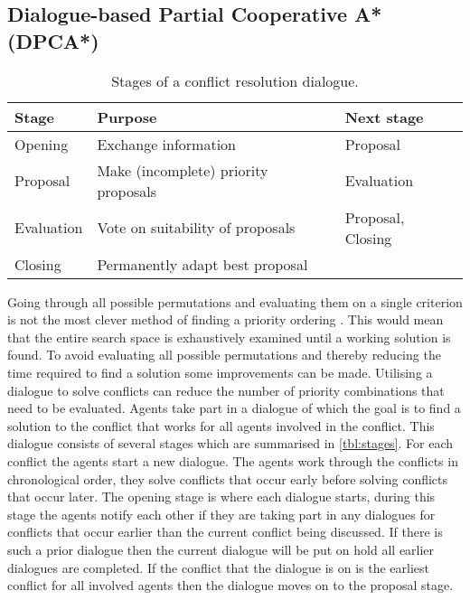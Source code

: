 \subsection{Dialogue-based Partial Cooperative A* (DPCA*)}
\begin{table}
    \centering
    \caption{Stages of a conflict resolution dialogue.}
    \label{tbl:stages}
    \begin{tabularx}{\columnwidth}{l|X|l}
        Stage & Purpose & Next stage \\ \hline
        Opening & Exchange information & Proposal \\
        Proposal & Make (incomplete) priority proposals & Evaluation \\
        Evaluation & Vote on suitability of proposals & Proposal, Closing \\
        Closing & Permanently adapt best proposal & \\
    \end{tabularx}
\end{table}

Going through all possible permutations and evaluating them on a single
criterion is not the most clever method of finding a priority ordering
\citep{bennewitz2002}. This would mean that the entire search space is
exhaustively examined until a working solution is found. To avoid evaluating
all possible permutations and thereby reducing the time required to find a
solution some improvements can be made. Utilising a dialogue to solve conflicts
can reduce the number of priority combinations that need to be evaluated.
Agents take part in a dialogue of which the goal is to find a solution to the
conflict that works for all agents involved in the conflict. This dialogue
consists of several stages which are summarised in \autoref{tbl:stages}. For
each conflict the agents start a new dialogue. The agents work through the
conflicts in chronological order, they solve conflicts that occur early before
solving conflicts that occur later. The opening stage is where each dialogue
starts, during this stage the agents notify each other if they are taking part
in any dialogues for conflicts that occur earlier than the current conflict
being discussed. If there is such a prior dialogue then the current dialogue
will be put on hold all earlier dialogues are completed. If the conflict that
the dialogue is on is the earliest conflict for all involved agents then the
dialogue moves on to the proposal stage.

